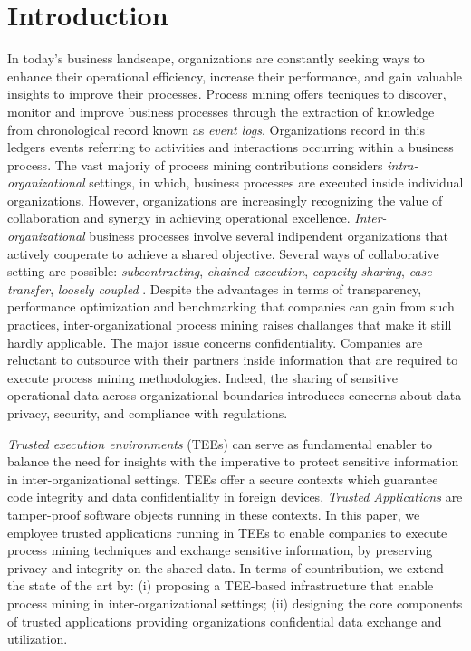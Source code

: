 \section{Introduction}
In today's business landscape, organizations are constantly seeking ways to enhance their operational efficiency, increase their performance, and gain valuable insights to improve their processes. Process mining offers tecniques to discover, monitor and improve business processes through the extraction of knowledge from chronological record known as \textit{event logs}. Organizations record in this ledgers events referring to activities and interactions occurring within a business process. The vast majoriy of process mining contributions considers \textit{intra-organizational} settings, in which, business processes are executed inside individual organizations. However, organizations are increasingly recognizing the value of collaboration and synergy in achieving operational excellence. \textit{Inter-organizational} business processes involve several indipendent organizations that actively cooperate to achieve a shared objective. Several ways of collaborative setting are possible: \textit{subcontracting}, \textit{chained execution}, \textit{capacity sharing}, \textit{case transfer}, \textit{loosely coupled} \cite{van1999process}. Despite the advantages in terms of transparency, performance optimization and benchmarking that companies can gain from such practices, inter-organizational process mining raises challanges that make it still hardly applicable. The major issue concerns confidentiality. Companies are reluctant to outsource with their partners inside information that are required to execute process mining methodologies. Indeed, the sharing of sensitive operational data across organizational boundaries introduces concerns about data privacy, security, and compliance with regulations. 

\textit{Trusted execution environments} (TEEs) can serve as fundamental enabler to balance the need for insights with the imperative to protect sensitive information in inter-organizational settings. TEEs offer a secure contexts which guarantee code integrity and data confidentiality in foreign devices. \textit{Trusted Applications} are tamper-proof software objects running in these contexts. In this paper, we employee trusted applications running in TEEs to enable companies to execute process mining techniques and exchange sensitive information, by preserving privacy and integrity on the shared data. In terms of countribution, we extend the state of the art by: (i) proposing a TEE-based infrastructure that enable process mining in inter-organizational settings; (ii) designing the core components of trusted applications providing organizations confidential data exchange and utilization.

